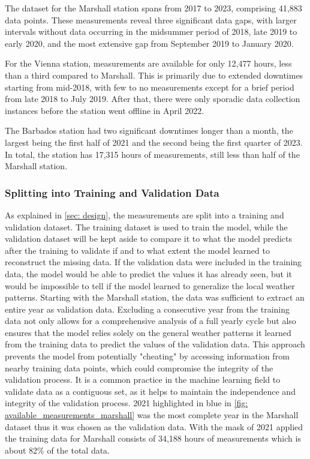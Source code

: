 The dataset for the Marshall station spans from 2017 to 2023, comprising 41,883 data points. These measurements reveal three significant data gaps, with larger intervals without data occurring in the midsummer period of 2018, late 2019 to early 2020, and the most extensive gap from September 2019 to January 2020.

For the Vienna station, measurements are available for only 12,477 hours, less than a third compared to Marshall. This is primarily due to extended downtimes starting from mid-2018, with few to no measurements except for a brief period from late 2018 to July 2019. After that, there were only sporadic data collection instances before the station went offline in April 2022.

The Barbados station had two significant downtimes longer than a month, the largest being the first half of 2021 and the second being the first quarter of 2023. In total, the station has 17,315 hours of measurements, still less than half of the Marshall station.

\subsubsection*{Splitting into Training and Validation Data}

As explained in \autoref{sec: design}, the measurements are split into a training and validation dataset. The training dataset is used to train the model, while the validation dataset will be kept aside to compare it to what the model predicts after the training to validate if and to what extent the model learned to reconstruct the missing data. If the validation data were included in the training data, the model would be able to predict the values it has already seen, but it would be impossible to tell if the model learned to generalize the local weather patterns.
Starting with the Marshall station, the data was sufficient to extract an entire year as validation data. Excluding a consecutive year from the training data not only allows for a comprehensive analysis of a full yearly cycle but also ensures that the model relies solely on the general weather patterns it learned from the training data to predict the values of the validation data. This approach prevents the model from potentially "cheating" by accessing information from nearby training data points, which could compromise the integrity of the validation process. It is a common practice in the machine learning field to validate data as a contiguous set, as it helps to maintain the independence and integrity of the validation process. 2021 highlighted in blue in \ref{fig: available_measurements_marshall} was the most complete year in the Marshall dataset thus it was chosen as the validation data. With the mask of 2021 applied the training data for Marshall consists of 34,188 hours of measurements which is about 82\% of the total data.

